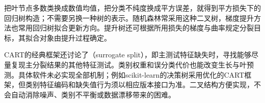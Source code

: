 把叶节点多数类换成数值均值，把分类不纯度换成平方误差，就得到平方损失下的回归树构造；不需要另换一种树的表示。随机森林常采用这种二叉树，梯度提升方法也常用回归树拟合更新方向。提升树还可根据所用损失的梯度与曲率规定分裂目标，其拟合对象由提升过程确定。

CART的经典框架还讨论了（surrogate split），即主测试特征缺失时，寻找能够尽量复现主分裂结果的其他特征测试。类别权重和误分类代价也能改变生长与叶预测。具体软件未必实现全部机制；例如scikit-learn的决策树采用优化的CART框架，但类别特征编码和缺失值行为须以相应版本接口为准。二叉结构方便实现，不会自动消除噪声、类别不平衡或数据漂移带来的困难。
